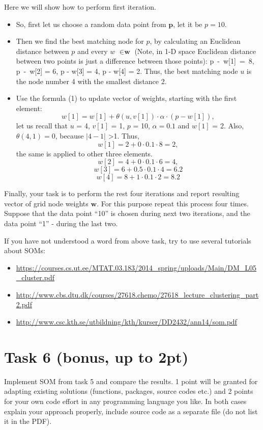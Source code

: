 \documentclass{article}
\begin{document}
Here we will show how to perform first iteration.
\begin{itemize}
\item So, first let us choose a random data point from $\textbf{p}$, let it be $p = 10$.
\item Then we find the best matching node for $p$, by calculating an Euclidean distance between $p$ and every $w$ $\in\textbf{w}$ (Note, in 1-D space Euclidean distance between two points is just a difference between those points): p~-~w[1]~=~8, p~-~w[2] = 6, p - w[3] = 4, p - w[4] = 2. Thus, the best matching node $u$ is the node number 4 with the smallest distance 2.
\item Use the formula (1) to update vector of weights, starting with the first element:
$$
w[1] = w[1] + \theta(u, v[1])\cdot\alpha\cdot(p - w[1]),
$$
let us recall that $u$ = 4, $v[1]$ = 1, $p$ = 10, $\alpha = 0.1$ and $w[1]$ = 2. Also, $\theta(4, 1) = 0$, because $|4 - 1|$ \textgreater  1. Thus,
$$
w[1] = 2 + 0\cdot0.1\cdot8 = 2,
$$
the same is applied to other three elements.
$$
w[2] = 4 +  0\cdot0.1\cdot6 = 4,
$$
$$
w[3] = 6 + 0.5\cdot0.1\cdot4 = 6.2
$$
$$
w[4] = 8 + 1\cdot0.1\cdot2 = 8.2
$$
\end{itemize}
Finally, your task is to perform the rest four iterations and report resulting vector of grid node weights  $\textbf{w}$. For this purpose repeat this process four times. Suppose that the data point ``10'' is chosen during next two iterations, and the data point ``1'' - during the last two.

If you have not understood a word from above task, try to use several tutorials about SOMs:
\begin{itemize}
\item \url{https://courses.cs.ut.ee/MTAT.03.183/2014_spring/uploads/Main/DM_L05_cluster.pdf}
\item \url{http://www.cbs.dtu.dk/courses/27618.chemo/27618_lecture_clustering_part2.pdf}
\item \url{http://www.csc.kth.se/utbildning/kth/kurser/DD2432/ann14/som.pdf}
\end{itemize}
\section*{Task 6 (bonus, up to 2pt)}
Implement SOM from task 5 and compare the results. 1 point will be granted for adapting existing solutions (functions, packages, source codes etc.) and 2 points for your own code effort in any programming language you like. In both cases explain your approach properly, include source code as a separate file (do not list it in the PDF). 
\end{document}
